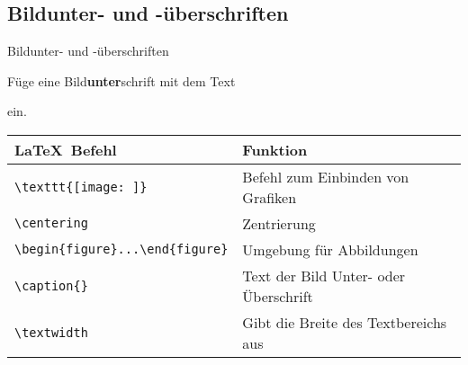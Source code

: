 \subsection{Bildunter- und -überschriften}
\begin{frame}[c]
	\begin{center}
		\large Bildunter- und -überschriften
	\end{center}
\end{frame}
\begin{frame}[fragile]
	\begin{Aufgabe}
		Füge eine Bild\textbf{unter}schrift mit dem Text
		
		\textrm{}
		
		ein.
	\end{Aufgabe}

	\btVFill\Befehle
	\begin{center}
		\begin{tabular}{ll}
			\toprule
			\LaTeX\ Befehl								&	Funktion								\\ \midrule
			\lstinline|\texttt{[image: ]}|			&	Befehl zum Einbinden von Grafiken		\\ 
			\lstinline|\centering|						&	Zentrierung								\\
			\lstinline|\begin{figure}...\end{figure}|	&	Umgebung für Abbildungen				\\
			\lstinline|\caption{}|						&	Text der Bild Unter- oder Überschrift	\\
			\lstinline|\textwidth|						&	Gibt die Breite des Textbereichs aus	\\
			\bottomrule
		\end{tabular}
	\end{center}
	\vspace{0.1cm}
\end{frame}
